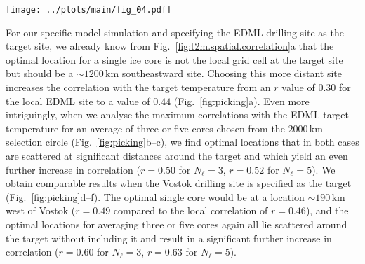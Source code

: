\documentclass[cp]{copernicus}
\begin{document}
\begin{figure*}[t]%
\centering
\texttt{[image: ../plots/main/fig\_04.pdf]}
\caption[Picking optimal sites]{%
  Selecting ice-core locations that optimally reconstruct interannual
  temperatures at the EDML and Vostok drilling sites. The maps show the
  correlation coefficient in the climate model data between the annual
  temperature time series at the target sites (black crosses) EDML
  (\textbf{a}--\textbf{c}) and Vostok (\textbf{b}--\textbf{f}) with the time
  series fields of precipitation-weighted oxygen isotope composition
  ($\delta^{18}\mathrm{O}^{\mathrm{(pw)}}$). Filled black points denote
  grid cells that yield the maximum correlation between the target site
  temperature and the $\delta^{18}\mathrm{O}^{\mathrm{(pw)}}$ time series from
  either selecting a single grid cell ($N_{\ell}=1$; \textbf{a}, \textbf{d}) or
  from averaging across $N_{\ell}=3$ (\textbf{b}, \textbf{e}) or $N_{\ell}=5$
  (\textbf{c}, \textbf{f}) grid cells, obtained from iteratively selecting sets
  of $N_{\ell}$ grid cells from within a selection circle of $2000$\,km radius
  around the target site indicated by the black radial lines (see
  Sect.~\ref{methods:opt.sampling} for details). Interestingly, non-local
  ice-core locations systematically show the strongest relationship with the
  target site temperature.}
\label{fig:picking}%
\end{figure*}%

For our specific model simulation and specifying the EDML drilling site as the
target site, we already know from {Fig.~\ref{fig:t2m.spatial.correlation}a} that
the optimal location for a single ice core is not the local grid cell at the
target site but should be a $\sim1200$\,km southeastward site. Choosing this
more distant site increases the correlation with the target temperature from an
$r$ value of $0.30$ for the local EDML site to a value of $0.44$
(Fig.~\ref{fig:picking}a). Even more intriguingly, when we analyse the maximum
correlations with the EDML target temperature for an average of three or five
cores chosen from the $2000$\,km selection circle (Fig.~\ref{fig:picking}b--c),
we find optimal locations that in both cases are scattered at significant
distances around the target and which yield an even further increase in
correlation ($r=0.50$ for $N_{\ell}=3$, $r=0.52$ for $N_{\ell}=5$). We obtain
comparable results when the Vostok drilling site is specified as the target
(Fig.~\ref{fig:picking}d--f). The optimal single core would be at a location
$\sim190$\,km west of Vostok ($r=0.49$ compared to the local correlation of
$r=0.46$), and the optimal locations for averaging three or five cores again all
lie scattered around the target without including it and result in a significant
further increase in correlation ($r=0.60$ for $N_{\ell}=3$, $r=0.63$ for
$N_{\ell}=5$).
\end{document}
